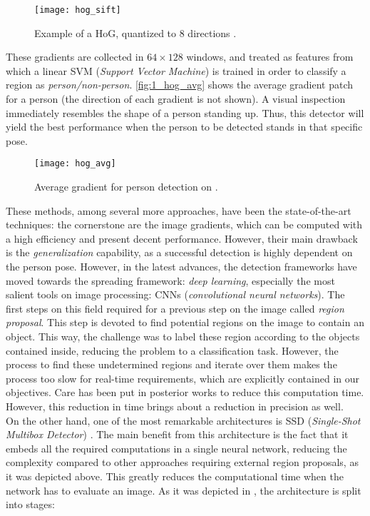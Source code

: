 \begin{figure}[h]
	\centering
	\texttt{[image: hog\_sift]}
	\caption{Example of a HoG, quantized to 8 directions \cite{diapos_cv_features}.}
	\label{fig:1_hog_sift}
\end{figure}



These gradients are collected in $64 \times 128$ windows, and treated as features from which a linear SVM (\textit{Support Vector Machine}) is trained in order to classify a region as \textit{person/non-person}. \autoref{fig:1_hog_avg} shows the average gradient patch for a person (the direction of each gradient is not shown). A visual inspection immediately resembles the shape of a person standing up. Thus, this detector will yield the best performance when the person to be detected stands in that specific pose.

\begin{figure}[h]
	\centering
	\texttt{[image: hog\_avg]}
	\caption{Average gradient for person detection on \cite{hog_detection}.}
	\label{fig:1_hog_avg}
\end{figure}

These methods, among several more approaches, have been the state-of-the-art techniques: the cornerstone are the image gradients, which can be computed with a high efficiency and present decent performance. However, their main drawback is the \textit{generalization} capability, as a successful detection is highly dependent on the person pose. However, in the latest advances, the detection frameworks have moved towards the spreading framework: \textit{deep learning}, especially the most salient tools on image processing: CNNs (\textit{convolutional neural networks}). The first steps on this field \cite{rcnn} required for a previous step on the image called \textit{region proposal}. This step is devoted to find potential regions on the image to contain an object. This way, the challenge was to label these region according to the objects contained inside, reducing the problem to a classification task. However, the process to find these undetermined regions and iterate over them makes the process too slow for real-time requirements, which are explicitly contained in our objectives. Care has been put in posterior works \cite{fastrcnn} \cite{spp} to reduce this computation time. However, this reduction in time brings about a reduction in precision as well.\\


On the other hand, one of the most remarkable architectures is SSD (\textit{Single-Shot Multibox Detector}) \cite{ssd}. The main benefit from this architecture is the fact that it embeds all the required computations in a single neural network, reducing the complexity compared to other approaches requiring external region proposals, as it was depicted above. This greatly reduces the computational time when the network has to evaluate an image. As it was depicted in \cite{tfg}, the architecture is split into stages:\\

